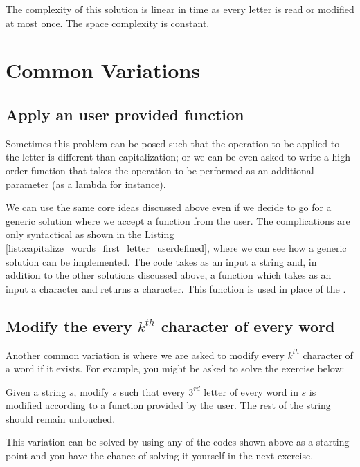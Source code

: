 The complexity of this solution is linear in time as every letter is read or modified at most once. The space complexity is constant.



\section{Common Variations}
\label{capitalize_words_first_letter:sec:variation}

\subsection{Apply an user provided function}
Sometimes this problem can be posed such that the operation to be applied to the letter is different than capitalization; or we can be even asked to write a high order function that takes the operation to be performed as an additional parameter (as a lambda for instance).

We can use the same core ideas discussed above even if we decide to go for a generic solution where we accept a function from the user. The complications are only syntactical as shown in the Listing \ref{list:capitalize_words_first_letter_userdefined}, where we can see how a generic solution can be implemented.
The code takes as an input a string and, in addition to the other solutions discussed above, a function  which takes as an input a character and returns a character. This function is used in place of the .



\subsection{Modify the every $k^{th}$ character of every word}
Another common variation is where we are asked to modify every $k^{th}$ character of a word if it exists. For example, you might be asked to solve the exercise below:
\begin{exercise}
Given a string $s$, modify $s$ such that every $3^{rd}$ letter of every word in $s$ is modified according to a function provided by the user. The rest of the string should remain untouched.
\end{exercise}

This variation can be solved by using any of the codes shown above as a starting point and you have the chance of solving it yourself in the next exercise.

